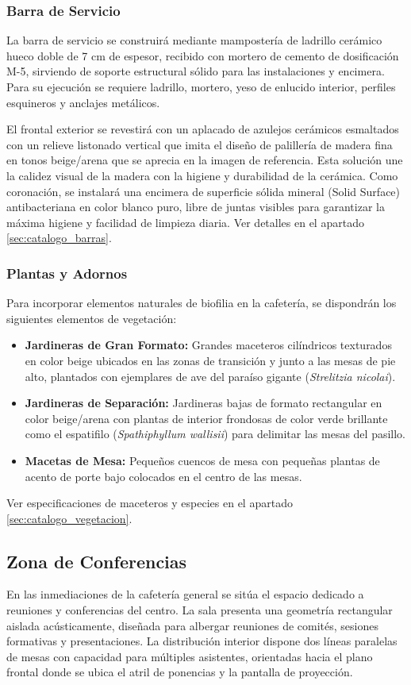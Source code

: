 \documentclass[12pt,a4paper]{article}
\begin{document}
\subsubsection{Barra de Servicio}
La barra de servicio se construirá mediante mampostería de ladrillo cerámico hueco doble de 7 cm de espesor, recibido con mortero de cemento de dosificación M-5, sirviendo de soporte estructural sólido para las instalaciones y encimera. Para su ejecución se requiere ladrillo, mortero, yeso de enlucido interior, perfiles esquineros y anclajes metálicos. 

El frontal exterior se revestirá con un aplacado de azulejos cerámicos esmaltados con un relieve listonado vertical que imita el diseño de palillería de madera fina en tonos beige/arena que se aprecia en la imagen de referencia. Esta solución une la calidez visual de la madera con la higiene y durabilidad de la cerámica. Como coronación, se instalará una encimera de superficie sólida mineral (Solid Surface) antibacteriana en color blanco puro, libre de juntas visibles para garantizar la máxima higiene y facilidad de limpieza diaria. Ver detalles en el apartado \ref{sec:catalogo_barras}.

\subsubsection{Plantas y Adornos}
Para incorporar elementos naturales de biofilia en la cafetería, se dispondrán los siguientes elementos de vegetación:
\begin{itemize}
    \item \textbf{Jardineras de Gran Formato:} Grandes maceteros cilíndricos texturados en color beige ubicados en las zonas de transición y junto a las mesas de pie alto, plantados con ejemplares de ave del paraíso gigante (\textit{Strelitzia nicolai}).
    \item \textbf{Jardineras de Separación:} Jardineras bajas de formato rectangular en color beige/arena con plantas de interior frondosas de color verde brillante como el espatifilo (\textit{Spathiphyllum wallisii}) para delimitar las mesas del pasillo.
    \item \textbf{Macetas de Mesa:} Pequeños cuencos de mesa con pequeñas plantas de acento de porte bajo colocados en el centro de las mesas.
\end{itemize}
Ver especificaciones de maceteros y especies en el apartado \ref{sec:catalogo_vegetacion}.

\subsection{Zona de Conferencias}
En las inmediaciones de la cafetería general se sitúa el espacio dedicado a reuniones y conferencias del centro. La sala presenta una geometría rectangular aislada acústicamente, diseñada para albergar reuniones de comités, sesiones formativas y presentaciones. La distribución interior dispone dos líneas paralelas de mesas con capacidad para múltiples asistentes, orientadas hacia el plano frontal donde se ubica el atril de ponencias y la pantalla de proyección.
\end{document}
